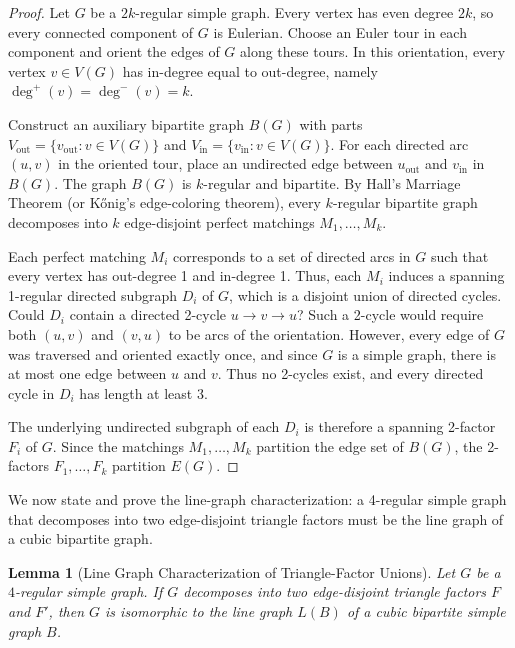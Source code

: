 \documentclass[11pt,reqno]{amsart}
\newtheorem{lemma}[theorem]{Lemma}
\theoremstyle{definition}
\theoremstyle{remark}
\begin{document}
\begin{proof}
Let $G$ be a $2k$-regular simple graph. Every vertex has even degree $2k$, so every connected component of $G$ is Eulerian. Choose an Euler tour in each component and orient the edges of $G$ along these tours. In this orientation, every vertex $v \in V(G)$ has in-degree equal to out-degree, namely $\deg^+(v) = \deg^-(v) = k$.

Construct an auxiliary bipartite graph $B(G)$ with parts $V_{\text{out}} = \{v_{\text{out}} : v \in V(G)\}$ and $V_{\text{in}} = \{v_{\text{in}} : v \in V(G)\}$. For each directed arc $(u, v)$ in the oriented tour, place an undirected edge between $u_{\text{out}}$ and $v_{\text{in}}$ in $B(G)$. The graph $B(G)$ is $k$-regular and bipartite. By Hall's Marriage Theorem (or K\H{o}nig's edge-coloring theorem), every $k$-regular bipartite graph decomposes into $k$ edge-disjoint perfect matchings $M_1, \dots, M_k$.

Each perfect matching $M_i$ corresponds to a set of directed arcs in $G$ such that every vertex has out-degree 1 and in-degree 1. Thus, each $M_i$ induces a spanning 1-regular directed subgraph $D_i$ of $G$, which is a disjoint union of directed cycles. Could $D_i$ contain a directed 2-cycle $u \to v \to u$? Such a 2-cycle would require both $(u, v)$ and $(v, u)$ to be arcs of the orientation. However, every edge of $G$ was traversed and oriented exactly once, and since $G$ is a simple graph, there is at most one edge between $u$ and $v$. Thus no 2-cycles exist, and every directed cycle in $D_i$ has length at least $3$.

The underlying undirected subgraph of each $D_i$ is therefore a spanning 2-factor $F_i$ of $G$. Since the matchings $M_1, \dots, M_k$ partition the edge set of $B(G)$, the 2-factors $F_1, \dots, F_k$ partition $E(G)$.
\end{proof}

We now state and prove the line-graph characterization: a 4-regular simple graph that decomposes into two edge-disjoint triangle factors must be the line graph of a cubic bipartite graph.

\begin{lemma}[Line Graph Characterization of Triangle-Factor Unions]\label{lem:four-regular}
Let $G$ be a $4$-regular simple graph. If $G$ decomposes into two edge-disjoint triangle factors $F$ and $F'$, then $G$ is isomorphic to the line graph $L(B)$ of a cubic bipartite simple graph $B$.
\end{lemma}
\end{document}
